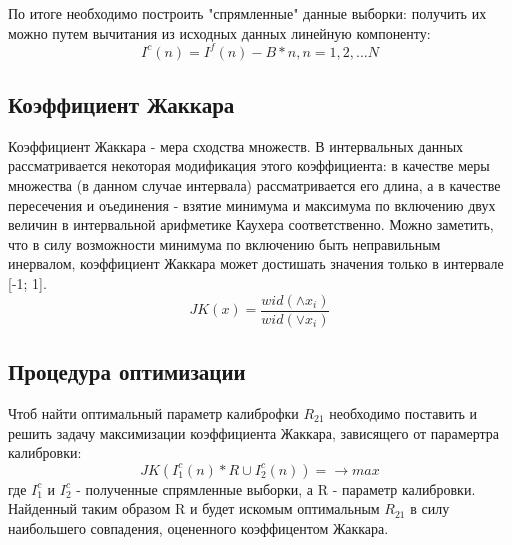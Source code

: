 \documentclass[main.tex]{subfiles}
\begin{document}
        По итоге необходимо построить "спрямленные" данные выборки: получить их можно путем вычитания из исходных данных линейную компоненту:
        \begin{equation}
            I^c(n) = I^f(n) - B * n, n = 1, 2, ... N
        \end{equation}
        
        \subsection{Коэффициент Жаккара}
        Коэффициент Жаккара - мера сходства множеств. В интервальных данных рассматривается некоторая модификация этого коэффициента: в качестве меры множества (в данном случае интервала) рассматривается его длина, а в качестве пересечения и оъединения - взятие минимума и максимума по включению двух величин в интервальной арифметике Каухера соответственно. Можно заметить, что в силу возможности минимума по включению быть неправильным инервалом, коэффициент Жаккара может достишать значения только в интервале [-1; 1].
        \begin{equation}
            JK(x) = \frac{wid(\wedge x_i)}{wid(\vee x_i)}
        \end{equation}
        
        \subsection{Процедура оптимизации}
        Чтоб найти оптимальный параметр калиброфки $R_21$ необходимо поставить и решить задачу максимизации коэффициента Жаккара, зависящего от парамертра калибровки:
        \begin{equation}
            JK(I_1^c(n) * R \cup I_2^c(n)) =  \rightarrow max
        \end{equation}
        где $I_1^c$ и $I_2^c$ - полученные спрямленные выборки, а R - параметр калибровки. Найденный таким образом R и будет искомым оптимальным $R_{21}$ в силу наибольшего совпадения, оцененного коэффицентом Жаккара.
\end{document}
